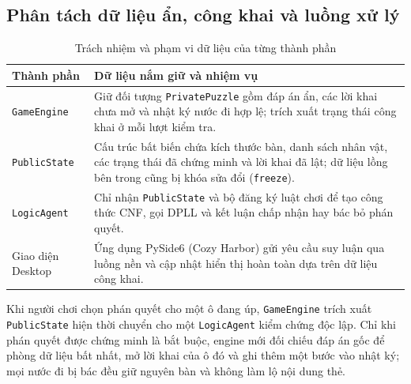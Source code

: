 \begin{center}\end{center}

\clearpage

\subsection{Phân tách dữ liệu ẩn, công khai và luồng xử lý}

\begin{table}[H]
\centering\small\singlespacing
\caption{Trách nhiệm và phạm vi dữ liệu của từng thành phần}
\smallskip
\renewcommand{\arraystretch}{1.23}
\begin{tabularx}{\linewidth}{@{}l >{\raggedright\arraybackslash}X@{}}
\toprule
\textbf{Thành phần} & \textbf{Dữ liệu nắm giữ và nhiệm vụ} \\
\midrule
\texttt{GameEngine} & Giữ đối tượng \texttt{PrivatePuzzle} gồm đáp án ẩn, các lời khai chưa mở và nhật ký nước đi hợp lệ; trích xuất trạng thái công khai ở mỗi lượt kiểm tra. \\
\texttt{PublicState} & Cấu trúc bất biến chứa kích thước bàn, danh sách nhân vật, các trạng thái đã chứng minh và lời khai đã lật; dữ liệu lồng bên trong cũng bị khóa sửa đổi (\texttt{freeze}). \\
\texttt{LogicAgent} & Chỉ nhận \texttt{PublicState} và bộ đăng ký luật chơi để tạo công thức CNF, gọi DPLL và kết luận chấp nhận hay bác bỏ phán quyết. \\
Giao diện Desktop & Ứng dụng PySide6 (Cozy Harbor) gửi yêu cầu suy luận qua luồng nền và cập nhật hiển thị hoàn toàn dựa trên dữ liệu công khai. \\
\bottomrule
\end{tabularx}
\end{table}

Khi người chơi chọn phán quyết cho một ô đang úp, \texttt{GameEngine} trích xuất \texttt{PublicState} hiện thời chuyển cho một \texttt{LogicAgent} kiểm chứng độc lập. Chỉ khi phán quyết được chứng minh là bắt buộc, engine mới đối chiếu đáp án gốc để phòng dữ liệu bất nhất, mở lời khai của ô đó và ghi thêm một bước vào nhật ký; mọi nước đi bị bác đều giữ nguyên bàn và không làm lộ nội dung thẻ.

